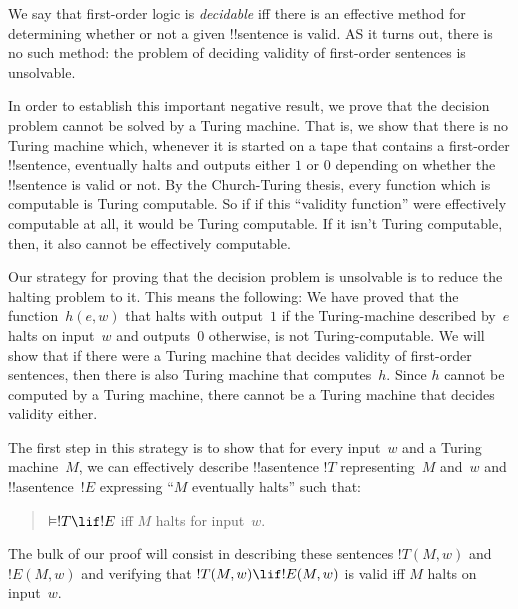 \documentclass[../../../include/open-logic-section]{subfiles}
\begin{document}

We say that first-order logic is \emph{decidable} iff there is an
effective method for determining whether or not a given !!{sentence}
is valid. AS it turns out, there is no such method: the problem of
deciding validity of first-order sentences is unsolvable.

In order to establish this important negative result, we prove that
the decision problem cannot be solved by a Turing machine.  That is,
we show that there is no Turing machine which, whenever it is started
on a tape that contains a first-order !!{sentence}, eventually halts
and outputs either $1$ or $0$ depending on whether the
!!{sentence} is valid or not. By the Church-Turing thesis, every
function which is computable is Turing computable. So if if this
``validity function'' were effectively computable at all, it would be
Turing computable. If it isn't Turing computable, then, it also cannot
be effectively computable.

Our strategy for proving that the decision problem is unsolvable is to
reduce the halting problem to it.  This means the following: We have
proved that the function~$h(e,w)$ that halts with output~$1$ if the
Turing-machine described by~$e$ halts on input~$w$ and outputs~$0$
otherwise, is not Turing-computable.  We will show that if there were
a Turing machine that decides validity of first-order sentences, then
there is also Turing machine that computes~$h$.  Since $h$ cannot be
computed by a Turing machine, there cannot be a Turing machine that
decides validity either.

The first step in this strategy is to show that for every input~$w$
and a Turing machine~$M$, we can effectively describe !!a{sentence}
$!T$ representing~$M$ and~$w$ and !!a{sentence}~$!E$ expressing ``$M$
eventually halts'' such that:
\begin{quote}
  $\Entails !T \lif !E$ iff $M$ halts for input~$w$.
\end{quote}
The bulk of our proof will consist in describing these sentences
$!T(M, w)$ and $!E(M, w)$ and verifying that $!T(M, w) \lif !E(M, w)$
is valid iff $M$ halts on input~$w$.
\end{document}
